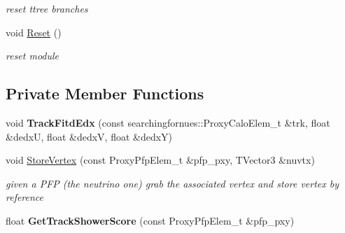 \begin{DoxyCompactItemize}
\begin{DoxyCompactList}\small\item\em reset ttree branches \end{DoxyCompactList}\item 
\hypertarget{classselection_1_1ShowerSelection_aa790f42dca70058f567f15e130627011}{void \hyperlink{classselection_1_1ShowerSelection_aa790f42dca70058f567f15e130627011}{Reset} ()}\label{classselection_1_1ShowerSelection_aa790f42dca70058f567f15e130627011}

\begin{DoxyCompactList}\small\item\em reset module \end{DoxyCompactList}\end{DoxyCompactItemize}
\subsection*{Private Member Functions}
\begin{DoxyCompactItemize}
\item 
\hypertarget{classselection_1_1ShowerSelection_a9cf0d6d41063cb9137db9d37500be7dd}{void {\bfseries Track\-Fitd\-Edx} (const searchingfornues\-::\-Proxy\-Calo\-Elem\-\_\-t \&trk, float \&dedx\-U, float \&dedx\-V, float \&dedx\-Y)}\label{classselection_1_1ShowerSelection_a9cf0d6d41063cb9137db9d37500be7dd}

\item 
\hypertarget{classselection_1_1ShowerSelection_a9f007d4be7a578b6d07db9172ad4ab14}{void \hyperlink{classselection_1_1ShowerSelection_a9f007d4be7a578b6d07db9172ad4ab14}{Store\-Vertex} (const Proxy\-Pfp\-Elem\-\_\-t \&pfp\-\_\-pxy, T\-Vector3 \&nuvtx)}\label{classselection_1_1ShowerSelection_a9f007d4be7a578b6d07db9172ad4ab14}

\begin{DoxyCompactList}\small\item\em given a P\-F\-P (the neutrino one) grab the associated vertex and store vertex by reference \end{DoxyCompactList}\item 
\hypertarget{classselection_1_1ShowerSelection_aa4c7b1935b0705093c8be5065a2d25ed}{float {\bfseries Get\-Track\-Shower\-Score} (const Proxy\-Pfp\-Elem\-\_\-t \&pfp\-\_\-pxy)}\label{classselection_1_1ShowerSelection_aa4c7b1935b0705093c8be5065a2d25ed}

\end{DoxyCompactItemize}

